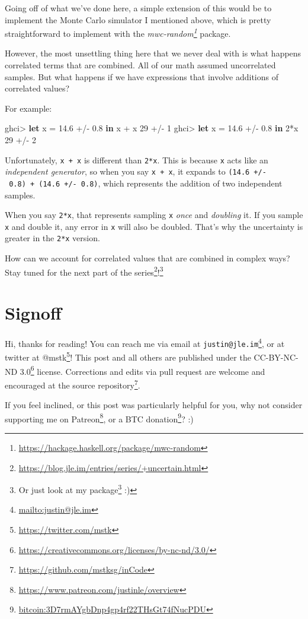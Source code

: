 \documentclass[]{article}
\newenvironment{Shaded}{}{}
\newcommand{\DecValTok}[1]{\textcolor[rgb]{0.25,0.63,0.44}{#1}}
\newcommand{\FloatTok}[1]{\textcolor[rgb]{0.25,0.63,0.44}{#1}}
\newcommand{\KeywordTok}[1]{\textcolor[rgb]{0.00,0.44,0.13}{\textbf{#1}}}
\newcommand{\NormalTok}[1]{#1}
\newcommand{\OperatorTok}[1]{\textcolor[rgb]{0.40,0.40,0.40}{#1}}
\newcommand{\OtherTok}[1]{\textcolor[rgb]{0.00,0.44,0.13}{#1}}
\renewcommand{\href}[2]{#2\footnote{\url{#1}}}
\begin{document}
Going off of what we've done here, a simple extension of this would be to
implement the Monte Carlo simulator I mentioned above, which is pretty
straightforward to implement with the
\emph{\href{https://hackage.haskell.org/package/mwc-random}{mwc-random}}
package.

However, the most unsettling thing here that we never deal with is what happens
correlated terms that are combined. All of our math assumed uncorrelated
samples. But what happens if we have expressions that involve additions of
correlated values?

For example:

\begin{Shaded}
\begin{Highlighting}[]
\NormalTok{ghci}\OperatorTok{>} \KeywordTok{let}\NormalTok{ x }\OtherTok{=} \FloatTok{14.6} \OperatorTok{+/{-}} \FloatTok{0.8} \KeywordTok{in}\NormalTok{ x }\OperatorTok{+}\NormalTok{ x}
\DecValTok{29} \OperatorTok{+/{-}} \DecValTok{1}
\NormalTok{ghci}\OperatorTok{>} \KeywordTok{let}\NormalTok{ x }\OtherTok{=} \FloatTok{14.6} \OperatorTok{+/{-}} \FloatTok{0.8} \KeywordTok{in} \DecValTok{2}\OperatorTok{*}\NormalTok{x}
\DecValTok{29} \OperatorTok{+/{-}} \DecValTok{2}
\end{Highlighting}
\end{Shaded}

Unfortunately, \texttt{x\ +\ x} is different than \texttt{2*x}. This is because
\texttt{x} acts like an \emph{independent generator}, so when you say
\texttt{x\ +\ x}, it expands to \texttt{(14.6\ +/-\ 0.8)\ +\ (14.6\ +/-\ 0.8)},
which represents the addition of two independent samples.

When you say \texttt{2*x}, that represents sampling \texttt{x} \emph{once} and
\emph{doubling} it. If you sample \texttt{x} and double it, any error in
\texttt{x} will also be doubled. That's why the uncertainty is greater in the
\texttt{2*x} version.

How can we account for correlated values that are combined in complex ways? Stay
tuned for the next part of the
\href{https://blog.jle.im/entries/series/+uncertain.html}{series}!\footnote{Or
  just look at my \href{https://hackage.haskell.org/package/uncertain}{package}
  :)}

\hypertarget{signoff}{%
\section{Signoff}\label{signoff}}

Hi, thanks for reading! You can reach me via email at
\href{mailto:justin@jle.im}{\nolinkurl{justin@jle.im}}, or at twitter at
\href{https://twitter.com/mstk}{@mstk}! This post and all others are published
under the \href{https://creativecommons.org/licenses/by-nc-nd/3.0/}{CC-BY-NC-ND
3.0} license. Corrections and edits via pull request are welcome and encouraged
at \href{https://github.com/mstksg/inCode}{the source repository}.

If you feel inclined, or this post was particularly helpful for you, why not
consider \href{https://www.patreon.com/justinle/overview}{supporting me on
Patreon}, or a \href{bitcoin:3D7rmAYgbDnp4gp4rf22THsGt74fNucPDU}{BTC donation}?
:)
\end{document}

